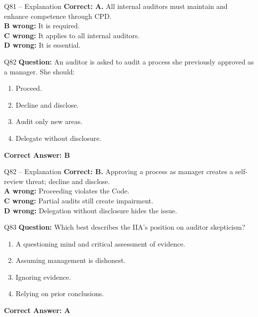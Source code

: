 \documentclass[aspectratio=169,10pt]{beamer}
\begin{document}
	\begin{frame}[t]{Q81 -- Explanation}
		\small
		\textbf{Correct: A.} All internal auditors must maintain and enhance competence through CPD. \\[4pt]
		\textbf{B wrong:} It is required. \\[2pt]
		\textbf{C wrong:} It applies to all internal auditors. \\[2pt]
		\textbf{D wrong:} It is essential.
	\end{frame}
	
	\begin{frame}[t]{Q82}
		\small
		\textbf{Question:} An auditor is asked to audit a process she previously approved as a manager. She should:
		\begin{enumerate}[label=\Alph*.,itemsep=1pt,topsep=2pt]
			\item Proceed.
			\item Decline and disclose.
			\item Audit only new areas.
			\item Delegate without disclosure.
		\end{enumerate}
		\vspace{4pt}
		\textbf{Correct Answer: B}
	\end{frame}
	
	\begin{frame}[t]{Q82 -- Explanation}
		\small
		\textbf{Correct: B.} Approving a process as manager creates a self-review threat; decline and disclose. \\[4pt]
		\textbf{A wrong:} Proceeding violates the Code. \\[2pt]
		\textbf{C wrong:} Partial audits still create impairment. \\[2pt]
		\textbf{D wrong:} Delegation without disclosure hides the issue.
	\end{frame}
	
	\begin{frame}[t]{Q83}
		\small
		\textbf{Question:} Which best describes the IIA's position on auditor skepticism?
		\begin{enumerate}[label=\Alph*.,itemsep=1pt,topsep=2pt]
			\item A questioning mind and critical assessment of evidence.
			\item Assuming management is dishonest.
			\item Ignoring evidence.
			\item Relying on prior conclusions.
		\end{enumerate}
		\vspace{4pt}
		\textbf{Correct Answer: A}
	\end{frame}
	
\end{document}

